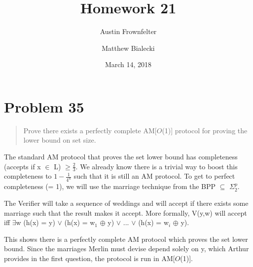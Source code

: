 \documentclass{article}
\title{Homework 21}
\author{Austin Frownfelter \and Matthew Bialecki}
\date{March 14, 2018}
\begin{document}
\maketitle

\section{Problem 35}
\begin{quote}
Prove there exists a perfectly complete AM[$O$(1)] protocol for proving the lower bound on set size.
\end{quote}

The standard AM protocol that proves the set lower bound has completeness (accepts if x $\in$ L) $\geq \frac23$.  We already know there is a trivial way to boost this completeness to $1-\frac1{4^n}$ such that it is still an AM protocol.  To get to perfect completeness (= 1), we will use the marriage technique from the BPP $\subseteq$ $\Sigma_2^p$.

The Verifier will take a sequence of weddings and will accept if there exists some marriage such that the result makes it accept.  More formally, V(y,w) will accept iff $\exists$w (h(x) = y) $\lor$ (h(x) = w$_1$ $\oplus$ y) $\lor$ ... $\lor$ (h(x) = w$_i$ $\oplus$ y).

This shows there is a perfectly complete AM protocol which proves the set lower bound.  Since the marriages Merlin must devise depend solely on y, which Arthur provides in the first question, the protocol is run in AM[$O$(1)].
\end{document}
